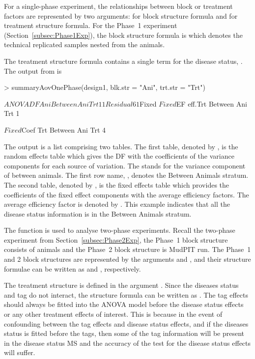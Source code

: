 \documentclass[article]{jss}
\begin{document}
For a single-phase experiment, the relationships between block or treatment factors are represented by two arguments:  for block structure formula and  for treatment structure formula. For the Phase~1 experiment (Section~\ref{subsec:Phase1Exp}), the block structure formula is  which denotes the technical replicated samples nested from the animals. 

The treatment structure formula contains a single term for the disease status, . The output from  is 
\begin{CodeChunk}
\begin{CodeInput}
> summaryAovOnePhase(design1, blk.str = "Ani", trt.str = "Trt") 
\end{CodeInput}
\begin{CodeOutput}
$ANOVA
            DF Ani
Between Ani       
   Trt      1  1  
   Residual 6  1  

$Fixed
$Fixed$EF
            eff.Trt
Between Ani        
   Trt      1      

$Fixed$Coef
            Trt
Between Ani    
   Trt      4  
\end{CodeOutput}
\end{CodeChunk}
The output is a list comprising two tables. The first table, denoted by , is the random effects table which gives the DF with the coefficients of the variance components for each source of variation. The  stands for the variance component of between animals. The first row name, , denotes the Between Animals stratum. The second table, denoted by , is the fixed effects table which provides the coefficients of the fixed effect components with the average efficiency factors. The average efficiency factor is denoted by . This example indicates that all the disease status information is in the Between Animals stratum.

The function  is used to analyse two-phase experiments. Recall the two-phase experiment from Section~\ref{subsec:Phase2Exp}, the Phase~1 block structure consists of animals and the Phase~2 block structure is MudPIT run. The Phase~1 and 2 block structures are represented by the arguments  and , and their structure formulae can be written as  and , respectively.

The treatment structure is defined in the argument . Since the diseases status and tag do not interact, the structure formula can be written as . The tag effects should always be fitted into the ANOVA model before the disease status effects or any other treatment effects of interest. This is because in the event of confounding between the tag effects and disease status effects, and if the diseases status is fitted before the tags, then some of the tag information will be present in the disease status MS and the accuracy of the test for the disease status effects will suffer. 
\end{document}
